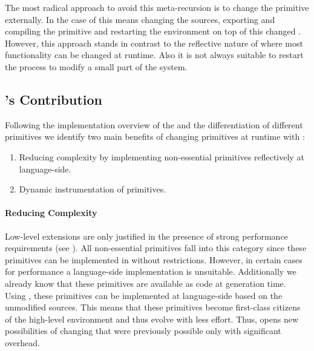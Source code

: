 The most radical approach to avoid this meta-recursion is to change the primitive externally.
In the case of \PH this means changing the \Slang sources, exporting and compiling the primitive and restarting the \PH environment on top of this changed \VM.
However, this approach stands in contrast to the reflective nature of \PH where most functionality can be changed at runtime.
Also it is not always suitable to restart the \PH process to modify a small part of the system.

\subsection{\WF's Contribution}
Following the implementation overview of the \PH \VM and the differentiation of different primitives we identify two main benefits of changing \VM primitives at runtime with \WF:

\begin{enumerate}
	\item Reducing \VM complexity by implementing non-essential primitives reflectively at language-side.
	\item Dynamic instrumentation of primitives.
\end{enumerate}

\paragraph{Reducing \VM Complexity}
Low-level \VM extensions are only justified in the presence of strong performance requirements (see ).
All non-essential primitives fall into this category since these primitives can be implemented in \PH without restrictions.
However, in certain cases for performance a language-side implementation is unsuitable.
Additionally we already know that these primitives are available as \Slang code at \VM generation time.
Using \WF, these primitives can be implemented at language-side based on the unmodified \Slang sources.
This means that these primitives become first-class citizens of the high-level environment and thus evolve with less effort.
Thus, \WF opens new possibilities of changing \PH that were previously possible only with significant overhead.

